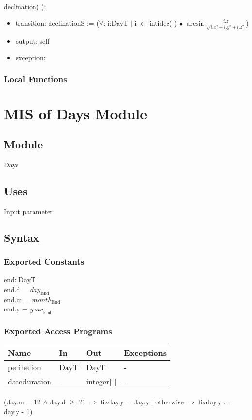 \documentclass[12pt, titlepage]{article}
\begin{document}
\noindent  declination( ):
\begin{itemize}
\item transition: declinationS := ($\forall$: i:DayT $|$ i $\in$ intidec( ) $\bullet$ $\arcsin \frac{i.z}{ \sqrt{i.x^2 + i.y^2 + i.z^2}}$)

\item output: self
\item exception: 
\end{itemize}
 

\subsubsection{Local Functions}

\section{MIS of Days Module} \label{ModuleDD} 
\subsection{Module}
Days

\subsection{Uses}
Input parameter

\subsection{Syntax}

\subsubsection{Exported Constants}

end: DayT\\
end.d = $\mathit{day}_\text{End}$\\
end.m = $\mathit{month}_\text{End}$\\
end.y = $\mathit{year}_\text{End}$\\

\subsubsection{Exported Access Programs}

\begin{center}
\begin{tabular}{p{2cm} p{4cm} p{4cm} p{2cm}}
\hline
\textbf{Name} & \textbf{In} & \textbf{Out} & \textbf{Exceptions} \\
\hline 
perihelion & DayT & DayT & - \\
dateduration & - & integer[ ] & - \\


\hline
\end{tabular}
\end{center}
 (day.m = 12 $	\wedge$ day.d $\geq	$ 21 $\Rightarrow$ fixday.y = day.y $|$ otherwise $\Rightarrow$ fixday.y := day.y - 1)
\end{document}
